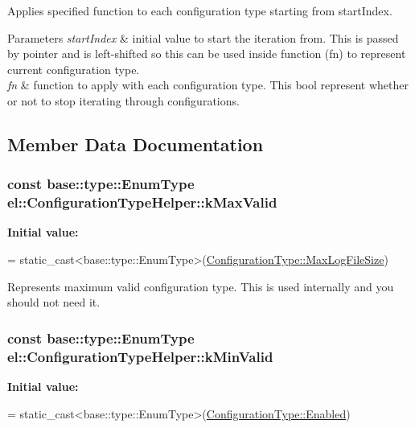 Applies specified function to each configuration type starting from start\-Index. 


\begin{DoxyParams}{Parameters}
{\em start\-Index} & initial value to start the iteration from. This is passed by pointer and is left-\/shifted so this can be used inside function (fn) to represent current configuration type. \\
\hline
{\em fn} & function to apply with each configuration type. This bool represent whether or not to stop iterating through configurations. \\
\hline
\end{DoxyParams}


\subsection{Member Data Documentation}
\hypertarget{classel_1_1ConfigurationTypeHelper_aa02f3cefb127e7eb97d7e1dd7f51a12d}{
\subsubsection[{k\-Max\-Valid}]{\setlength{\rightskip}{0pt plus 5cm}const base\-::type\-::\-Enum\-Type el\-::\-Configuration\-Type\-Helper\-::k\-Max\-Valid\hspace{0.3cm}{\ttfamily [static]}}}\label{classel_1_1ConfigurationTypeHelper_aa02f3cefb127e7eb97d7e1dd7f51a12d}
{\bfseries Initial value\-:}
\begin{DoxyCode}
=
      \textcolor{keyword}{static\_cast<}base::type::EnumType\textcolor{keyword}{>}(\hyperlink{namespaceel_a281f5db6d6163678bc68a8b23b59e124a4b35e615142d60db6383426f051e700b}{ConfigurationType::MaxLogFileSize})
\end{DoxyCode}


Represents maximum valid configuration type. This is used internally and you should not need it. 

\hypertarget{classel_1_1ConfigurationTypeHelper_ab7266e698eb32dec2da285325a66e322}{
\subsubsection[{k\-Min\-Valid}]{\setlength{\rightskip}{0pt plus 5cm}const base\-::type\-::\-Enum\-Type el\-::\-Configuration\-Type\-Helper\-::k\-Min\-Valid\hspace{0.3cm}{\ttfamily [static]}}}\label{classel_1_1ConfigurationTypeHelper_ab7266e698eb32dec2da285325a66e322}
{\bfseries Initial value\-:}
\begin{DoxyCode}
=
      \textcolor{keyword}{static\_cast<}base::type::EnumType\textcolor{keyword}{>}(\hyperlink{namespaceel_a281f5db6d6163678bc68a8b23b59e124a00d23a76e43b46dae9ec7aa9dcbebb32}{ConfigurationType::Enabled})
\end{DoxyCode}


